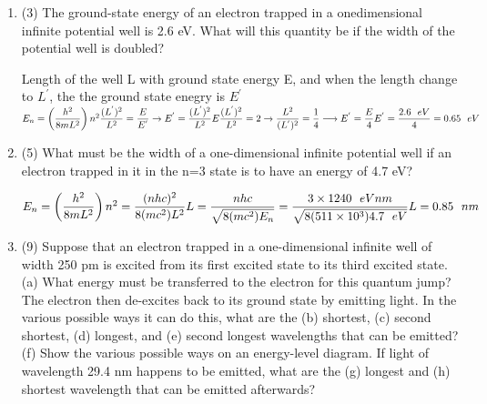\documentclass[fleqn]{article}
\begin{document}
  \begin{enumerate}
    \item (3) The ground-state energy of an electron trapped in a onedimensional infinite potential well is 2.6 eV. What will this quantity
    be if the width of the potential well is doubled?

      \textcolor{hwColor}{
        Length of the well L with ground state energy E, and when the length change to $L^{'}$, the the ground state enegry is $E^{'}$ \\
        $
          E_n=\left(\dfrac{h^2}{8mL^2}\right)n^2 \\
          \\
          \dfrac{(L^{'})^2}{L^2}=\dfrac{E}{E^{'}} \rightarrow E^{'}=\dfrac{(L^{'})^2}{L^2} E \\
          \\
          \dfrac{(L^{'})^2}{L^2}=2 \rightarrow \dfrac{L^2}{(L^{'})^2}=\dfrac{1}{4} \longrightarrow E^{'}=\dfrac{E}{4} \\
          \\
          E^{'}=\dfrac{2.6 ~~ eV}{4}=0.65 ~~ eV
        $
      }

    \item (5) What must be the width of a one-dimensional infinite potential well if an electron trapped in it in the n=3 state is to
    have an energy of 4.7 eV?

      \textcolor{hwColor}{
        $
          E_n=\left(\dfrac{h^2}{8mL^2}\right)n^2=\dfrac{(nhc)^2}{8(mc^2)L^2} \\
          \\
          \\
          L=\dfrac{nhc}{\sqrt{8(mc^2)E_n}}=\dfrac{3 \times 1240 ~~ eV nm}{\sqrt{8(511 \times 10^3)4.7 ~~ eV}} \\
          \\
          L=0.85 ~~ nm
        $
      }

    \item (9) Suppose that an electron trapped in a one-dimensional infinite well of width 250 pm is excited from its first excited state to its third
    excited state. (a) What energy must be transferred to the electron for this quantum jump? The electron then de-excites back to its ground state by emitting light. In the various possible ways it can do this,
    what are the (b) shortest, (c) second shortest, (d) longest, and (e) second longest wavelengths that can be emitted? (f) Show the various possible ways on an energy-level diagram. If light of wavelength
    29.4 nm happens to be emitted, what are the (g) longest and (h) shortest wavelength that can be emitted afterwards?
    

\end{enumerate}
\end{document}
